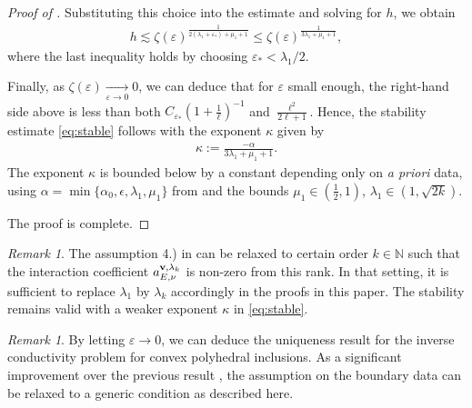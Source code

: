 ﻿\documentclass[11pt,reqno,oneside]{amsart}
\theoremstyle{definition}
\theoremstyle{remark}
\newtheorem{remark}[theorem]{Remark}
\newcommand{\tendvers}[2]{\underset{{#1}\rightarrow {#2}}{\longrightarrow}}
\newcommand{\N}{\mathbb{N}}
\renewcommand{\a}{\alpha}
\newcommand{\e}{\varepsilon}
\newcommand{\lm}{\lambda}
\newcommand{\ds}{\displaystyle}
\begin{document}
\begin{proof}[Proof of ]
            Substituting this choice into the estimate and solving for $h$, we obtain
            \begin{align*}
                h \lesssim \zeta(\e)^{\frac{1}{2(\lm_1+\e_*)+\mu_1+1}}\leq \zeta(\e)^{\frac{1}{3\lm_1+\mu_1+1}},%
            \end{align*}
            where the last inequality holds by choosing $\e_*<\lm_1/2$.

            Finally, as $\ds \zeta(\e)\tendvers{\e}{0} 0$, we can deduce that for $\e$ small enough, the right-hand side above is less than both $C_{\e_*}\left(1+\frac{1}{\ell}\right)^{-1}$ and $\frac{\ell^2}{2\ell+1}$. Hence, the stability estimate \eqref{eq:stable} follows with the exponent $\kappa$ given by
            \begin{align*}
               \kappa:= \frac{-\a }{3\lm_1+\mu_1+1}.
            \end{align*}
            The exponent $\kappa$ is bounded below by a constant depending only on {\it a priori} data, using $\a=\min\{\a_0,\epsilon,\lm_1,\mu_1\}$ from  and the bounds $\mu_1\in (\frac{1}{2},1)$, $\lm_1\in (1,\sqrt{2k})$.

            The proof is complete.
        \end{proof}

        \medskip
  
        \begin{remark}
            The assumption 4.) in  can be relaxed to certain order $k\in\N$ such that the interaction coefficient $a_{E,\nu}^{{\bf v},\lm_k}$ is non-zero from this rank. In that setting, it is sufficient to replace $\lm_1$ by $\lm_k$ accordingly in the proofs in this paper. The stability remains valid with a weaker exponent $\kappa$ in \eqref{eq:stable}. 
        \end{remark}

        \medskip

        \begin{remark}
            By letting $\e\rightarrow 0$, we can deduce the uniqueness result for the inverse conductivity problem for convex polyhedral inclusions. As a significant improvement over the previous result \cite{Barcelo1994}, the assumption on the boundary data can be relaxed to a generic condition as described here.
        \end{remark}        
    
        \appendix
\end{document}
